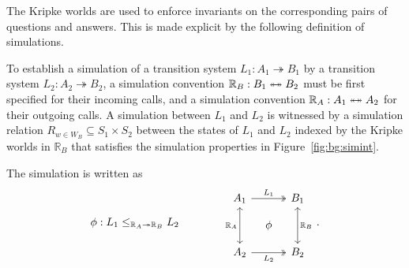 The Kripke worlds are used to enforce invariants
on the corresponding pairs of questions and answers.
This is made explicit by the following definition
of simulations.

\begin{definition}[Simulation]
  To establish a simulation
  of a transition system $L_1: A_1 \twoheadrightarrow B_1$
  by a transition system $L_2: A_2 \twoheadrightarrow B_2$,
  a simulation convention
  $\mathbb{R}_B : B_1 \twoheadleftarrow \mathrel{\mkern-15mu} \twoheadrightarrow B_2$
  must be first specified
  for their incoming calls,
  and a simulation convention
  $\mathbb{R}_A : A_1 \twoheadleftarrow \mathrel{\mkern-15mu} \twoheadrightarrow A_2$
  for their outgoing calls.
  A simulation between $L_1$ and $L_2$
  is witnessed by a simulation relation
  $R_{w \in W_B} \subseteq S_1 \times S_2$
  between the states of $L_1$ and $L_2$
  indexed by the Kripke worlds in $\mathbb{R}_B$
  that satisfies the simulation properties
  in Figure~\ref{fig:bg:simint}.

  The simulation is written as
  \[
    \phi : L_1 \le_{\mathbb{R}_A \twoheadrightarrow \mathbb{R}_B} L_2
    \qquad\qquad
    \begin{tikzcd}[row sep=2ex, column sep=2ex]
      A_1 \ar[rr, twoheadrightarrow, "L_1"]
      \ar[dd, leftrightarrow, "\mathbb{R}_A"'] &&
      B_1 \ar[dd, leftrightarrow, "\mathbb{R}_B"] \\
      & \phi & \\
      A_2 \ar[rr, twoheadrightarrow, "L_2"'] && B_2
    \end{tikzcd}
    \,.
  \]
\end{definition}

